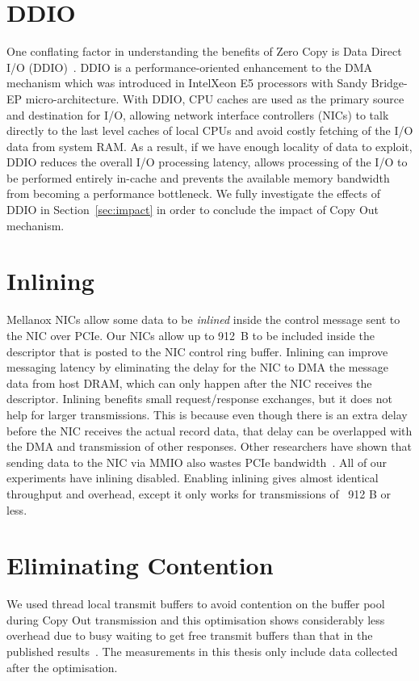 \section{DDIO}
One conflating factor in understanding the benefits of Zero Copy is Data Direct I/O (DDIO)~\cite{ddio}.
 DDIO is a performance-oriented enhancement to the DMA mechanism which was introduced in Intel\textregistered Xeon E5 processors with Sandy Bridge-EP micro-architecture.
 With DDIO\textregistered, CPU caches are used as the primary source and destination for I/O, 
allowing network interface controllers (NICs) to talk directly to the last level caches of local CPUs
and avoid costly fetching of the I/O data from system RAM. As a result, if we have enough locality of data to exploit,
DDIO reduces the overall I/O processing latency, allows processing of the I/O 
to be performed entirely in-cache and prevents the available memory bandwidth from becoming a performance bottleneck.
We fully investigate the effects of DDIO in Section~\ref{sec:impact} in order to conclude the impact of 
Copy Out mechanism.


\section{Inlining}
Mellanox NICs allow some data to be {\em inlined} inside the control message
sent to the NIC over PCIe. Our NICs allow up to 912~B to be included inside the
descriptor that is posted to the NIC control ring buffer.  Inlining can improve
messaging latency by eliminating the delay for the NIC to DMA the message data
from host DRAM, which can only happen after the NIC receives the descriptor.
Inlining benefits small request/response exchanges, but it does not help for
larger transmissions. This is because even though there is an extra delay
before the NIC receives the actual record data, that delay can be overlapped
with the DMA and transmission of other responses. Other researchers have shown
that sending data to the NIC via MMIO also wastes PCIe bandwidth~\cite{rdma}.
All of our experiments have inlining disabled. Enabling inlining gives almost identical throughput and overhead, except it only
works for transmissions of ~912 B or less.

\section{Eliminating Contention}
We used thread local transmit buffers to avoid contention on the buffer pool during Copy Out transmission and this optimisation shows considerably less 
overhead due to busy waiting to get free transmit buffers than that in the published results~\cite{imdmpaper}. 
The measurements in this thesis only include data collected after the optimisation.


